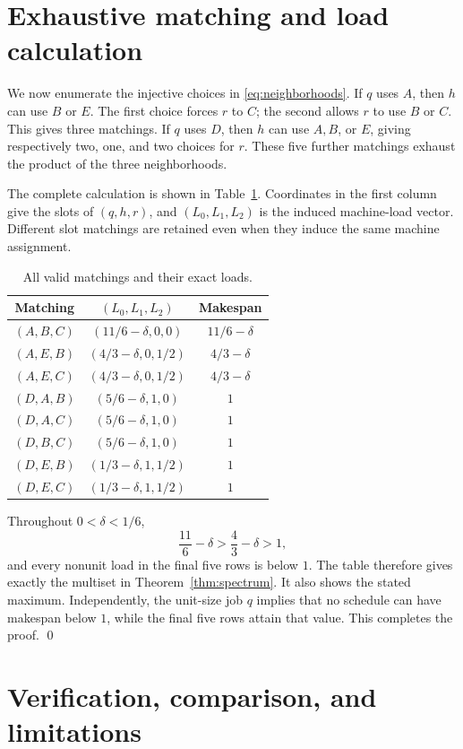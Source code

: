 \documentclass[11pt]{article}
\begin{document}
\section{Exhaustive matching and load calculation}

We now enumerate the injective choices in \eqref{eq:neighborhoods}.  If $q$
uses $A$, then $h$ can use $B$ or $E$.  The first choice forces $r$ to $C$;
the second allows $r$ to use $B$ or $C$.  This gives three matchings.  If $q$
uses $D$, then $h$ can use $A,B$, or $E$, giving respectively two, one, and
two choices for $r$.  These five further matchings exhaust the product of the
three neighborhoods.

The complete calculation is shown in Table~\ref{tab:loads}.  Coordinates in
the first column give the slots of $(q,h,r)$, and $(L_0,L_1,L_2)$ is the
induced machine-load vector.  Different slot matchings are retained even when
they induce the same machine assignment.

\begin{table}[ht]
\centering
\caption{All valid matchings and their exact loads.}
\label{tab:loads}
\begin{tabular}{@{}ccc@{}}
\toprule
Matching & $(L_0,L_1,L_2)$ & Makespan \\ \midrule
$(A,B,C)$ & $(11/6-\delta,0,0)$ & $11/6-\delta$\\
$(A,E,B)$ & $(4/3-\delta,0,1/2)$ & $4/3-\delta$\\
$(A,E,C)$ & $(4/3-\delta,0,1/2)$ & $4/3-\delta$\\
$(D,A,B)$ & $(5/6-\delta,1,0)$ & $1$\\
$(D,A,C)$ & $(5/6-\delta,1,0)$ & $1$\\
$(D,B,C)$ & $(5/6-\delta,1,0)$ & $1$\\
$(D,E,B)$ & $(1/3-\delta,1,1/2)$ & $1$\\
$(D,E,C)$ & $(1/3-\delta,1,1/2)$ & $1$\\ \bottomrule
\end{tabular}
\end{table}

Throughout $0<\delta<1/6$,
\[
 \frac{11}{6}-\delta>\frac43-\delta>1,
\]
and every nonunit load in the final five rows is below $1$.  The table
therefore gives exactly the multiset in Theorem~\ref{thm:spectrum}.  It also
shows the stated maximum.  Independently, the unit-size job $q$ implies that
no schedule can have makespan below $1$, while the final five rows attain that
value.  This completes the proof. \qed

\section{Verification, comparison, and limitations}
\end{document}
